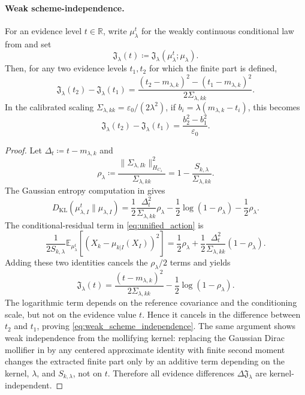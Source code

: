 \documentclass[11pt]{amsart}
\theoremstyle{plain}
\theoremstyle{definition}
\theoremstyle{remark}
\newcommand{\KL}{D_{\operatorname{KL}}}
\newcommand{\E}{\mathbb{E}}
\begin{document}
\paragraph{Weak scheme-independence.}
For an evidence level $t\in\mathbb{R}$, write $\mu_\lambda^t$ for the weakly continuous conditional law from  and set
\[
  \mathfrak{J}_\lambda(t)\coloneqq
  \mathfrak{J}_\lambda(\mu_\lambda^t;\mu_\lambda).
\]
Then, for any two evidence levels $t_1,t_2$ for which the finite part is defined,
\begin{equation}
  \label{eq:weak_scheme_independence}
  \mathfrak{J}_\lambda(t_2)-\mathfrak{J}_\lambda(t_1)
  =
  \frac{(t_2-m_{\lambda,k})^2-(t_1-m_{\lambda,k})^2}
       {2\Sigma_{\lambda,kk}}.
\end{equation}
In the calibrated scaling $\Sigma_{\lambda,kk}=\varepsilon_0/(2\lambda^2)$, if
$b_i=\lambda(m_{\lambda,k}-t_i)$, this becomes
\[
  \mathfrak{J}_\lambda(t_2)-\mathfrak{J}_\lambda(t_1)
  =
  \frac{b_2^2-b_1^2}{\varepsilon_0}.
\]
\begin{proof}
Let $\Delta_t\coloneqq t-m_{\lambda,k}$ and
\[
  \rho_\lambda
  \coloneqq
  \frac{\|\Sigma_{\lambda,Ik}\|_{H_{C_\lambda}}^2}{\Sigma_{\lambda,kk}}
  =
  1-\frac{S_{k,\lambda}}{\Sigma_{\lambda,kk}}.
\]
The Gaussian entropy computation in  gives
\[
  \KL(\mu_{\lambda,I}^t\parallel\mu_{\lambda,I})
  =
  \frac{1}{2}\frac{\Delta_t^2}{\Sigma_{\lambda,kk}}\rho_\lambda
  -\frac{1}{2}\log(1-\rho_\lambda)-\frac{1}{2}\rho_\lambda .
\]
The conditional-residual term in \eqref{eq:unified_action} is
\[
  \frac{1}{2S_{k,\lambda}}
  \E_{\mu_\lambda^t}\!\left[
    (X_k-\mu_{k|I}(X_I))^2
  \right]
  =
  \frac{1}{2}\rho_\lambda
  +
  \frac{1}{2}\frac{\Delta_t^2}{\Sigma_{\lambda,kk}}(1-\rho_\lambda).
\]
Adding these two identities cancels the $\rho_\lambda/2$ terms and yields
\[
  \mathfrak{J}_\lambda(t)
  =
  \frac{(t-m_{\lambda,k})^2}{2\Sigma_{\lambda,kk}}
  -\frac{1}{2}\log(1-\rho_\lambda).
\]
The logarithmic term depends on the reference covariance and the conditioning
scale, but not on the evidence value $t$. Hence it cancels in the difference
between $t_2$ and $t_1$, proving \eqref{eq:weak_scheme_independence}. The same
argument shows weak independence from the mollifying kernel: replacing the
Gaussian Dirac mollifier in  by any centered
approximate identity with finite second moment changes the extracted finite
part only by an additive term depending on the kernel, $\lambda$, and
$S_{k,\lambda}$, not on $t$. Therefore all evidence differences
$\Delta\mathfrak{J}_\lambda$ are kernel-independent.
\end{proof}
\end{document}
